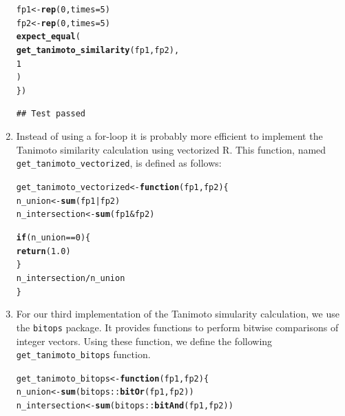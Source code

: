 \documentclass[a4paper,11pt]{article}\usepackage[]{graphicx}\usepackage[]{xcolor}
\makeatletter
\newcommand{\hlnum}[1]{\textcolor[rgb]{0.686,0.059,0.569}{#1}}%
\newcommand{\hlopt}[1]{\textcolor[rgb]{0,0,0}{#1}}%
\newcommand{\hldef}[1]{\textcolor[rgb]{0.345,0.345,0.345}{#1}}%
\newcommand{\hlkwa}[1]{\textcolor[rgb]{0.161,0.373,0.58}{\textbf{#1}}}%
\newcommand{\hlkwb}[1]{\textcolor[rgb]{0.69,0.353,0.396}{#1}}%
\newcommand{\hlkwc}[1]{\textcolor[rgb]{0.333,0.667,0.333}{#1}}%
\newcommand{\hlkwd}[1]{\textcolor[rgb]{0.737,0.353,0.396}{\textbf{#1}}}%
\newenvironment{kframe}{%
 \def\at@end@of@kframe{}%
 \ifinner\ifhmode%
  \def\at@end@of@kframe{\end{minipage}}%
  \begin{minipage}{\columnwidth}%
 \fi\fi%
 \def\FrameCommand##1{\hskip\@totalleftmargin \hskip-\fboxsep
 \colorbox{shadecolor}{##1}\hskip-\fboxsep
     \hskip-\linewidth \hskip-\@totalleftmargin \hskip\columnwidth}%
 \MakeFramed {\advance\hsize-\width
   \@totalleftmargin\z@ \linewidth\hsize
   \@setminipage}}%
 {\par\unskip\endMakeFramed%
 \at@end@of@kframe}
\newenvironment{knitrout}{}{} %
\newcommand{\code}[1]{\texttt{#1}}
\makeatother
\begin{document}
\begin{enumerate}
\begin{knitrout}
\begin{kframe}
\begin{alltt}
  \hldef{fp1} \hlkwb{<-} \hlkwd{rep}\hldef{(}\hlnum{0}\hldef{,} \hlkwc{times} \hldef{=} \hlnum{5}\hldef{)}
  \hldef{fp2} \hlkwb{<-} \hlkwd{rep}\hldef{(}\hlnum{0}\hldef{,} \hlkwc{times} \hldef{=} \hlnum{5}\hldef{)}
  \hlkwd{expect_equal}\hldef{(}
    \hlkwd{get_tanimoto_similarity}\hldef{(fp1, fp2),}
    \hlnum{1}
  \hldef{)}
\hldef{\})}
\end{alltt}
\begin{verbatim}
## Test passed
\end{verbatim}
\end{kframe}
\end{knitrout}




\item Instead of using a for-loop it is probably more efficient to implement the Tanimoto similarity calculation using vectorized R. This function, named \code{get\_tanimoto\_vectorized}, is defined as follows:

\begin{knitrout}
\color{fgcolor}\begin{kframe}
\begin{alltt}
\hldef{get_tanimoto_vectorized} \hlkwb{<-} \hlkwa{function}\hldef{(}\hlkwc{fp1}\hldef{,} \hlkwc{fp2}\hldef{) \{}
  \hldef{n_union} \hlkwb{<-} \hlkwd{sum}\hldef{(fp1} \hlopt{|} \hldef{fp2)}
  \hldef{n_intersection} \hlkwb{<-} \hlkwd{sum}\hldef{(fp1} \hlopt{&} \hldef{fp2)}

  \hlkwa{if} \hldef{(n_union} \hlopt{==} \hlnum{0}\hldef{) \{}
    \hlkwd{return}\hldef{(}\hlnum{1.0}\hldef{)}
  \hldef{\}}
  \hldef{n_intersection} \hlopt{/} \hldef{n_union}
\hldef{\}}
\end{alltt}
\end{kframe}
\end{knitrout}




\item For our third implementation of the Tanimoto simularity calculation, we use the \code{bitops} package. It provides functions to perform bitwise comparisons of integer vectors. Using these function, we define the following \code{get\_tanimoto\_bitops} function.  

\begin{knitrout}
\color{fgcolor}\begin{kframe}
\begin{alltt}
\hldef{get_tanimoto_bitops} \hlkwb{<-} \hlkwa{function}\hldef{(}\hlkwc{fp1}\hldef{,} \hlkwc{fp2}\hldef{) \{}
  \hldef{n_union} \hlkwb{<-} \hlkwd{sum}\hldef{(bitops}\hlopt{::}\hlkwd{bitOr}\hldef{(fp1, fp2))}
  \hldef{n_intersection} \hlkwb{<-} \hlkwd{sum}\hldef{(bitops}\hlopt{::}\hlkwd{bitAnd}\hldef{(fp1, fp2))}


\end{alltt}
\end{kframe}
\end{knitrout}
\end{enumerate}
\end{document}
